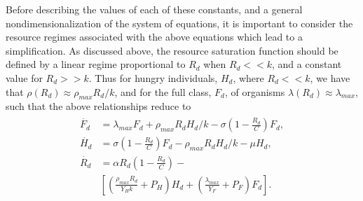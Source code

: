 \documentclass{pnastwo}
\begin{document}
\begin{article}
Before describing the values of each of these constants, and a general nondimensionalization of the system of equations, it is important to consider the resource regimes associated with the above equations which lead to a simplification. As discussed above, the resource saturation function should be defined by a linear regime proportional to $R_{d}$ when $R_{d}<<k$, and a constant value for $R_{d}>>k$. Thus for hungry individuals, $H_{d}$, where $R_{d}<<k$, we have that $\rho\left(R_{d}\right)\approx\rho_{max}R_{d}/k$, and for the full class, $F_{d}$, of organisms $\lambda\left(R_{d}\right)\approx\lambda_{max}$, such that the above relationships reduce to
\begin{align}
\begin{split}
\dot{F_{d}} &= \lambda_{max} F_{d} + \rho_{max}R_{d}H_{d}/k - \sigma \left(1-\frac{R_{d}}{C}\right)F_{d},  \\
\dot{H_{d}} &= \sigma \left(1-\frac{R_{d}}{C}\right)F_{d} - \rho_{max}R_{d} H_{d}/k - \mu H_{d},  \\
\dot{R_{d}} &= \alpha R_{d}\left(1-\frac{R_{d}}{C}\right) -\\
& \left[\left(\frac{\rho_{max}R_{d}}{Y_{H}k}+P_{H}\right)H_{d}+\left(\frac{\lambda_{max}}{Y_{F}}+P_{F}\right)F_{d}\right].
\end{split}
\end{align}


\end{article}
\end{document}
